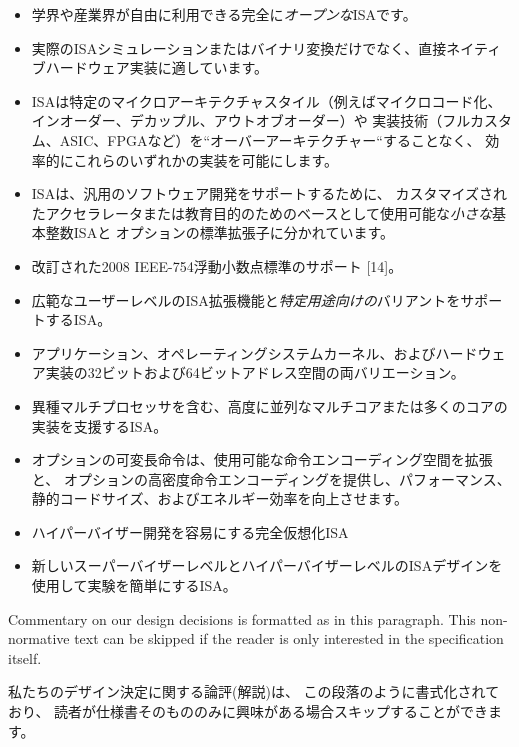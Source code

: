 \vspace{-0.1in}
\begin{itemize}
\parskip 0pt
\itemsep 1pt
\item 学界や産業界が自由に利用できる完全に{\em オープンな}ISAです。
\item 実際のISAシミュレーションまたはバイナリ変換だけでなく、直接ネイティブハードウェア実装に適しています。
\item ISAは特定のマイクロアーキテクチャスタイル（例えばマイクロコード化、インオーダー、デカップル、アウトオブオーダー）や
  実装技術（フルカスタム、ASIC、FPGAなど）を``オーバーアーキテクチャー``することなく、
  効率的にこれらのいずれかの実装を可能にします。
\item ISAは、汎用のソフトウェア開発をサポートするために、
  カスタマイズされたアクセラレータまたは教育目的のためのベースとして使用可能な{\em 小さな}基本整数ISAと
  オプションの標準拡張子に分かれています。
\item 改訂された2008 IEEE-754浮動小数点標準のサポート [14]。
\item 広範なユーザーレベルのISA拡張機能と{\em 特定用途向けの}バリアントをサポートするISA。
\item アプリケーション、オペレーティングシステムカーネル、およびハードウェア実装の32ビットおよび64ビットアドレス空間の両バリエーション。
\item 異種マルチプロセッサを含む、高度に並列なマルチコアまたは多くのコアの実装を支援するISA。
\item オプションの可変長命令は、使用可能な命令エンコーディング空間を拡張と、
  オプションの高密度命令エンコーディングを提供し、パフォーマンス、
  静的コードサイズ、およびエネルギー効率を向上させます。
\item ハイパーバイザー開発を容易にする完全仮想化ISA
\item 新しいスーパーバイザーレベルとハイパーバイザーレベルのISAデザインを使用して実験を簡単にするISA。
\end{itemize}
\vspace{-0.1in}

\begin{commentary}
  Commentary on our design decisions is formatted as in this
  paragraph.  This non-normative text can be skipped if the reader is
  only interested in the specification itself.
\end{commentary}
\begin{commentary}
  私たちのデザイン決定に関する論評(解説)は、
  この段落のように書式化されており、
  読者が仕様書そのもののみに興味がある場合スキップすることができます。
\end{commentary}


